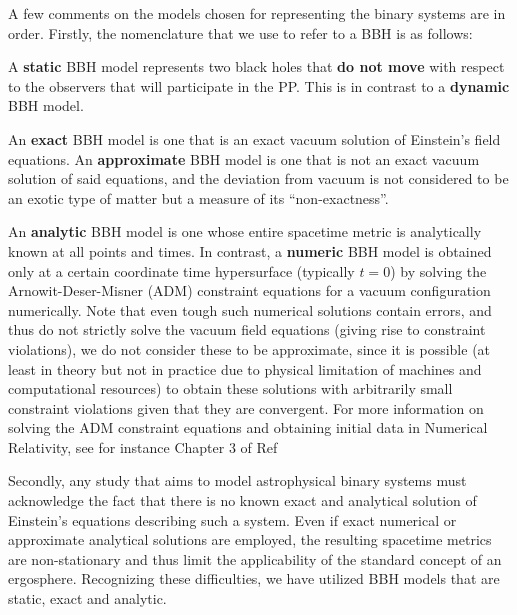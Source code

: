 A few comments on the models chosen for representing the binary systems are in order. Firstly, the nomenclature that we use to refer to a BBH is as follows:

\begin{definition}
    A \textbf{static} BBH model represents two black holes that \textbf{do not move} with respect to the observers that will participate in the PP. This is in contrast to a \textbf{dynamic} BBH model.
\end{definition}

\begin{definition}
    An \textbf{exact} BBH model is one that is an exact vacuum solution of Einstein's field equations. An \textbf{approximate} BBH model is one that is not an exact vacuum solution of said equations, and the deviation from vacuum is not considered to be an exotic type of matter but a measure of its ``non-exactness''.
\end{definition}

\begin{definition}
    An \textbf{analytic} BBH model is one whose entire spacetime metric is analytically known at all points and times. In contrast, a \textbf{numeric} BBH model is obtained only at a certain coordinate time hypersurface (typically $t=0$) by solving the Arnowit-Deser-Misner (ADM) constraint equations for a vacuum configuration numerically. Note that even tough such numerical solutions contain errors, and thus do not strictly solve the vacuum field equations (giving rise to constraint violations), we do not consider these to be approximate, since it is possible (at least in theory but not in practice due to physical limitation of machines and computational resources) to obtain these solutions with arbitrarily small constraint violations given that they are convergent. For more information on solving the ADM constraint equations and obtaining initial data in Numerical Relativity, see for instance Chapter 3 of Ref~\cite{Alcubierre2012-xp}
\end{definition}

Secondly, any study that aims to model astrophysical binary systems must acknowledge the fact that there is no known exact and analytical solution of Einstein's equations describing such a system. Even if exact numerical or approximate analytical solutions are employed, the resulting spacetime metrics are non-stationary and thus limit the applicability of the standard concept of an ergosphere. Recognizing these difficulties, we have utilized BBH models that are static, exact and analytic.

